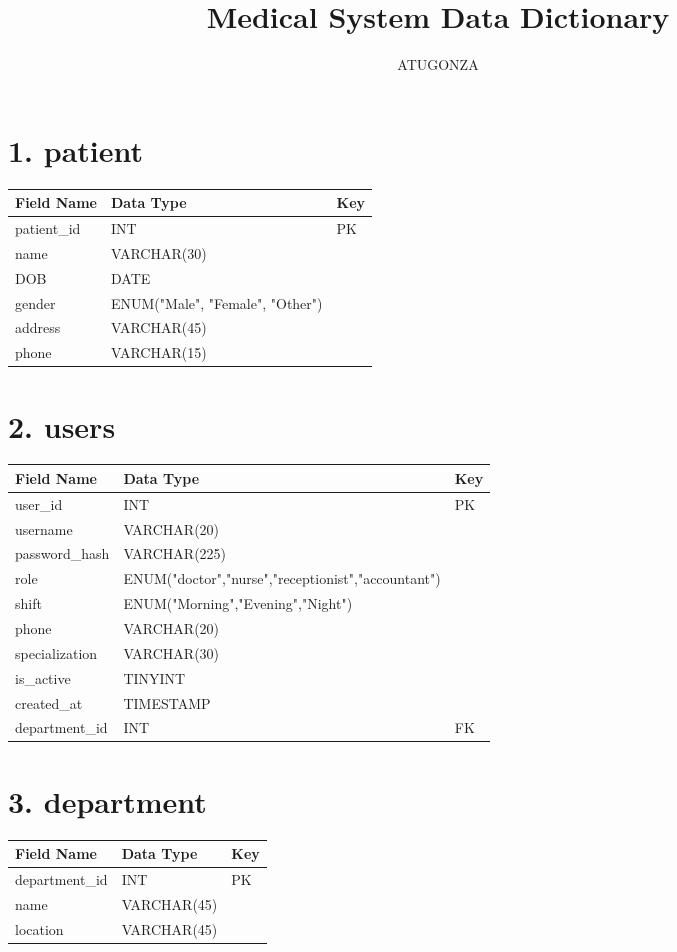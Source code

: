 \documentclass{article}
\begin{document}
\title{Medical System Data Dictionary}
\author{ATUGONZA}
\date{}
\maketitle

\newcommand{\tableheader}{
\hline
\textbf{Field Name} & \textbf{Data Type} & \textbf{Key} \\
\hline
}

\section*{1. patient}
\begin{longtable}{|p{4cm}|p{6cm}|p{3cm}|}
\tableheader
patient\_id & INT & PK \\
name & VARCHAR(30) &  \\
DOB & DATE &  \\
gender & ENUM("Male", "Female", "Other") &  \\
address & VARCHAR(45) &  \\
phone & VARCHAR(15) &  \\
\hline
\end{longtable}

\section*{2. users}
\begin{longtable}{|p{4cm}|p{6cm}|p{3cm}|}
\tableheader
user\_id & INT & PK \\
username & VARCHAR(20) &  \\
password\_hash & VARCHAR(225) &  \\
role & ENUM("doctor","nurse","receptionist","accountant") &  \\
shift & ENUM("Morning","Evening","Night") &  \\
phone & VARCHAR(20) &  \\
specialization & VARCHAR(30) &  \\
is\_active & TINYINT &  \\
created\_at & TIMESTAMP &  \\
department\_id & INT & FK \\
\hline
\end{longtable}

\section*{3. department}
\begin{longtable}{|p{4cm}|p{6cm}|p{3cm}|}
\tableheader
department\_id & INT & PK \\
name & VARCHAR(45) &  \\
location & VARCHAR(45) &  \\
\hline
\end{longtable}
\end{document}
